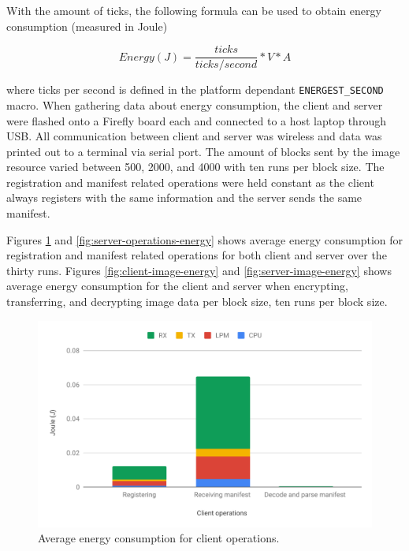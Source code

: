 \documentclass[0-thesis.tex]{subfiles}
\begin{document}
With the amount of ticks, the following formula can be used to obtain energy consumption
(measured in Joule)

$$ Energy (J) = \frac{ticks}{ticks/second} * V * A $$

where ticks per second is defined in the platform dependant \texttt{ENERGEST\_SECOND}
macro. When gathering data about energy consumption, the client and server were flashed
onto a Firefly board each and connected to a host laptop through USB. All communication
between client and server was wireless and data was printed out to a terminal via serial
port. The amount of blocks sent by the image resource varied between 500, 2000, and 4000
with ten runs per block size. The registration and manifest related operations were held
constant as the client always registers with the same information and the server sends the
same manifest. 

Figures \ref{fig:client-operations-energy} and \ref{fig:server-operations-energy} shows
average energy consumption for registration and manifest related operations for both
client and server over the thirty runs. Figures \ref{fig:client-image-energy} and
\ref{fig:server-image-energy} shows average energy consumption for the client and server
when encrypting, transferring, and decrypting image data per block size, ten runs per
block size. 

\begin{figure}[h!]
    \caption{Average energy consumption for client operations.}
    \label{fig:client-operations-energy}
    \includegraphics[scale=0.65]{images/client-operations-energy.pdf}
\end{figure}
\end{document}

